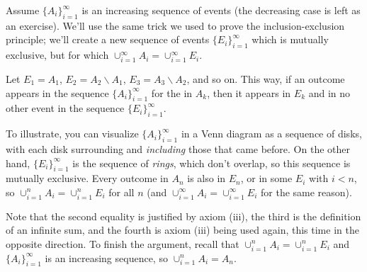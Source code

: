 \begin{pf}
Assume $\{A_i\}_{i=1}^{\infty}$ is an increasing sequence of events (the decreasing case is left as an exercise). We'll use the same trick we used to prove the inclusion-exclusion principle; we'll create a new sequence of events $\{E_i\}_{i=1}^{\infty}$ which is mutually exclusive, but for which $\cup_{i=1}^{\infty} A_i = \cup_{i=1}^{\infty} E_i$.
\par
Let $E_1 = A_1$, $E_2 = A_2 \backslash A_1$, $E_3 = A_3 \backslash A_2$, and so on. This way, if an outcome appears in the sequence $\{A_i\}_{i=1}^{\infty}$ for the  in $A_k$, then it appears  in $E_k$ and in no other event in the sequence $\{E_i\}_{i=1}^{\infty}$.
\begin{center}
\end{center}
\par
To illustrate, you can visualize $\{A_i\}_{i=1}^{\infty}$ in a Venn diagram as a sequence of disks, with each disk surrounding and \emph{including} those that came before. On the other hand, $\{E_i\}_{i=1}^{\infty}$ is the sequence of \emph{rings}, which don't overlap, so this sequence is mutually exclusive. Every outcome in $A_n$ is also in $E_n$, or in some $E_i$ with $i < n$, so $\cup_{i=1}^{n} A_i = \cup_{i=1}^{n} E_i$ for all $n$ (and $\cup_{i=1}^{\infty} A_i = \cup_{i=1}^{\infty} E_i$ for the same reason).
\par
Note that the second equality is justified by axiom (iii), the third is the definition of an infinite sum, and the fourth is axiom (iii) being used again, this time in the opposite direction. To finish the argument, recall that $\cup_{i=1}^{n} A_i = \cup_{i=1}^{n} E_i$ and $\{A_i\}_{i=1}^{\infty}$ is an increasing sequence, so $\cup_{i=1}^{n} A_i = A_n$.
\end{pf}

